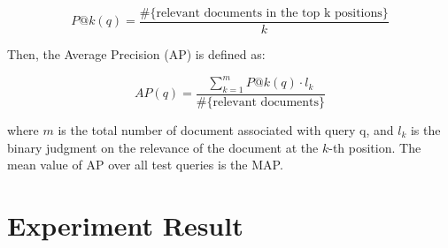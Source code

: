 \begin{displaymath}
P@k(q) = \frac{\#\text{\{relevant documents in the top k positions\}}}{k}
\end{displaymath}

Then, the Average Precision (AP) is defined as:

\begin{displaymath}
AP(q) = \frac{\sum_{k=1}^m P@k(q) \cdot l_k}{\#\text{\{relevant documents\}}}
\end{displaymath}

where \(m\) is the total number of document associated with query q, and \(l_k\) is the binary judgment on the relevance of the document at the \(k\)-th position. The mean value of AP over all test queries is the MAP. 

\section{Experiment Result}





